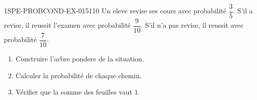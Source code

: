 \begin{exercice}{1SPE-PROBCOND-EX-015}{1}{10}
Un eleve revise ses cours avec probabilité $\dfrac{3}{5}$. S'il a revise, il reussit l'examen avec probabilité $\dfrac{9}{10}$. S'il n'a pas revise, il reussit avec probabilité $\dfrac{7}{10}$.

\begin{enumerate}
  \item Construire l'arbre pondere de la situation.
  \item Calculer la probabilité de chaque chemin.
  \item Vérifier que la somme des feuilles vaut $1$.
\end{enumerate}
\end{exercice}
